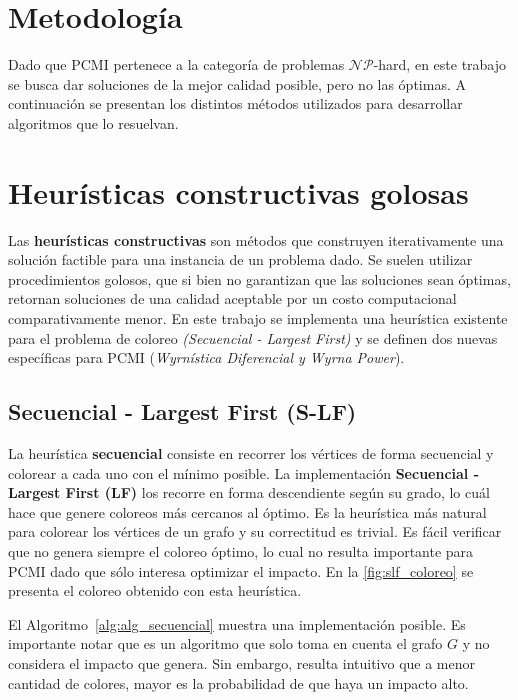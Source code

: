 \section{Metodología}\label{metodologia}

Dado que PCMI pertenece a la categoría de problemas $\mathcal{NP}$-hard, en este trabajo se busca dar soluciones de la mejor calidad posible, pero no las óptimas. A continuación se presentan los distintos métodos utilizados para desarrollar algoritmos que lo resuelvan.

\section{Heurísticas constructivas golosas}

Las \textbf{heurísticas constructivas} son métodos que construyen iterativamente una solución factible para una instancia de un problema dado. Se suelen utilizar procedimientos golosos, que si bien no garantizan que las soluciones sean óptimas, retornan soluciones de una calidad aceptable por un costo computacional comparativamente menor. En este trabajo se implementa una heurística existente para el problema de coloreo \textit{(Secuencial - Largest First)} y se definen dos nuevas específicas para PCMI (\textit{Wyrnística Diferencial y Wyrna Power}).

\subsection{Secuencial - Largest First (S-LF)}

La heurística \textbf{secuencial} consiste en recorrer los vértices de forma secuencial y colorear a cada uno con el mínimo posible. La implementación \textbf{Secuencial - Largest First (LF)} los recorre en forma descendiente según su grado, lo cuál hace que genere coloreos más cercanos al óptimo. Es la heurística más natural para colorear los vértices de un grafo y su correctitud es trivial. Es fácil verificar que no genera siempre el coloreo óptimo, lo cual no resulta importante para PCMI dado que sólo interesa optimizar el impacto. En la \cref{fig:slf_coloreo} se presenta el coloreo obtenido con esta heurística.

El Algoritmo~\ref{alg:alg_secuencial} muestra una implementación posible. Es importante notar que es un algoritmo que solo toma en cuenta el grafo $G$ y no considera el impacto que genera. Sin embargo, resulta intuitivo que a menor cantidad de colores, mayor es la probabilidad de que haya un impacto alto.

